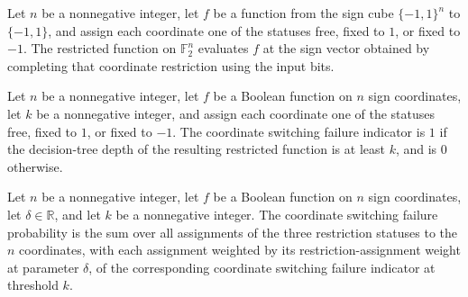 \begin{definition}
\label{FABL.CoordRestriction.restrict}
\leanok
{}
Let $n$ be a nonnegative integer, let $f$ be a function from the sign cube
$\{−1,1\}^n$ to $\{−1,1\}$, and assign each coordinate one of the statuses free,
fixed to $1$, or fixed to $-1$. The restricted function on $\mathbb F_2^n$ evaluates
$f$ at the sign vector obtained by completing that coordinate restriction using the
input bits.
\end{definition}

\begin{definition}
\label{FABL.coordSwitchingFailureIndicator}
\leanok
{}
Let $n$ be a nonnegative integer, let $f$ be a Boolean function on $n$ sign coordinates,
let $k$ be a nonnegative integer, and assign each coordinate one of the statuses free,
fixed to $1$, or fixed to $-1$. The coordinate switching failure indicator is $1$ if the
decision-tree depth of the resulting restricted function is at least $k$, and is $0$
otherwise.
\end{definition}

\begin{definition}
\label{FABL.coordSwitchingFailureProbability}
\leanok
{}
Let $n$ be a nonnegative integer, let $f$ be a Boolean function on $n$ sign coordinates,
let $\delta\in\mathbb R$, and let $k$ be a nonnegative integer. The coordinate
switching failure probability is the sum over all assignments of the three restriction
statuses to the $n$ coordinates, with each assignment weighted by its
restriction-assignment weight at parameter $\delta$, of the corresponding coordinate
switching failure indicator at threshold $k$.
\end{definition}

